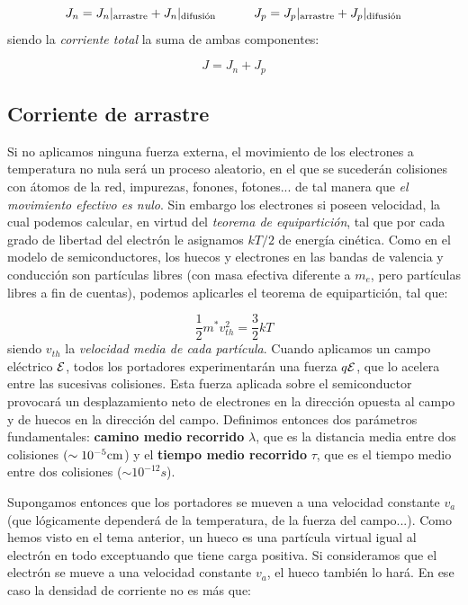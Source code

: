 \begin{equation}
	J_n =  {J_n}|_{\text{arrastre}} + {J_n}|_{\text{difusión}} \quad \quad \quad
	J_p =  {J_p}|_{\text{arrastre}} + {J_p}|_{\text{difusión}}
\end{equation}
siendo la \textit{corriente total} la suma de ambas componentes:

\begin{equation}
	J = J_n + J_p
\end{equation}

\subsection{Corriente de arrastre}

Si no aplicamos ninguna fuerza externa, el movimiento de los electrones a temperatura no nula será un proceso aleatorio, en el que se sucederán colisiones con átomos de la red, impurezas, fonones, fotones... de tal manera que \textit{el movimiento efectivo es nulo}. Sin embargo los electrones si poseen velocidad, la cual podemos calcular, en virtud del \textit{teorema de equipartición}, tal que por cada grado de libertad del electrón le asignamos $kT/2$ de energía cinética. Como en el modelo de semiconductores, los huecos y electrones en las bandas de valencia y conducción son partículas libres (con masa efectiva diferente a $m_e$, pero partículas libres a fin de cuentas), podemos aplicarles el teorema de equipartición, tal que:

\begin{equation}
	\frac{1}{2} m^* v_{th}^2 = \frac{3}{2} kT
\end{equation}
siendo $v_{th}$ la \textit{velocidad media de cada partícula}. Cuando aplicamos un campo eléctrico $\mathcal{E}$, todos los portadores experimentarán una fuerza $q\mathcal{E}$, que lo acelera entre las sucesivas colisiones. Esta fuerza aplicada sobre el semiconductor provocará un desplazamiento neto de electrones en la dirección opuesta al campo y de huecos en la dirección del campo. Definimos entonces dos parámetros fundamentales: \textbf{camino medio recorrido} $\lambda$, que es la distancia media entre dos colisiones $(\sim 10^{-5} \text{cm}$) y el \textbf{tiempo medio recorrido} $\tau$, que es el tiempo medio entre dos colisiones ($\sim 10^{-12} s$).

Supongamos entonces que los portadores se mueven a una velocidad constante $v_a$ (que lógicamente dependerá de la temperatura, de la fuerza del campo...). Como hemos visto en el tema anterior, un hueco es una partícula virtual igual al electrón en todo exceptuando que tiene carga positiva. Si consideramos que el electrón se mueve a una velocidad constante $v_a$, el hueco también lo hará. En ese caso la densidad de corriente no es más que:

